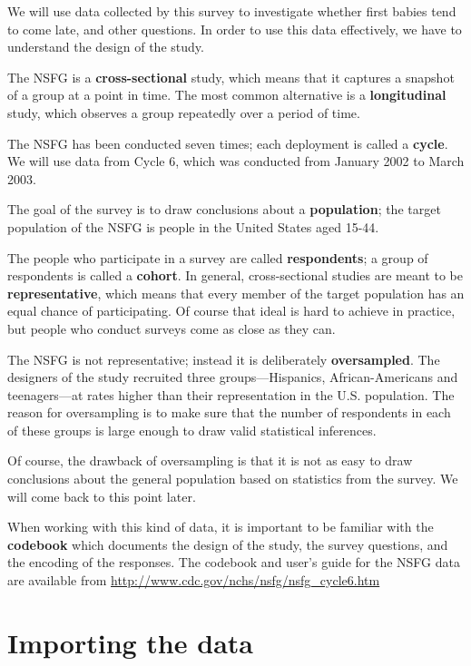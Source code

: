 \documentclass[12pt]{book}
\begin{document}
We will use data collected by this survey to investigate whether first
babies tend to come late, and other questions.  In order to use this
data effectively, we have to understand the design of the study.

The NSFG is a {\bf cross-sectional} study, which means that it
captures a snapshot of a group at a point in time.  The most
common alternative is a {\bf longitudinal} study, which observes a
group repeatedly over a period of time.

The NSFG has been conducted seven times; each deployment is called a
{\bf cycle}.  We will use data from Cycle 6, which was conducted from
January 2002 to March 2003.  

The goal of the survey is to draw conclusions about a {\bf
  population}; the target population of the NSFG is people in the
United States aged 15-44.  

The people who participate in a survey are called {\bf respondents}; a
group of respondents is called a {\bf cohort}.  In general,
cross-sectional studies are meant to be {\bf representative}, which
means that every member of the target population has an equal chance
of participating.  Of course that ideal is hard to achieve in
practice, but people who conduct surveys come as close as they can.
 

The NSFG is not representative; instead it is deliberately {\bf
  oversampled}.  The designers of the study recruited three
groups---Hispanics, African-Americans and teenagers---at rates higher
than their representation in the U.S. population.  The reason for
oversampling is to make sure that the number of respondents in each of
these groups is large enough to draw valid statistical inferences.

Of course, the drawback of oversampling is that it is not as easy
to draw conclusions about the general population based on statistics
from the survey.  We will come back to this point later.

When working with this kind of data, it is important to be familiar
with the {\bf codebook} which documents the design of the study, the
survey questions, and the encoding of the responses.  The codebook and
user's guide for the NSFG data are available from
\url{http://www.cdc.gov/nchs/nsfg/nsfg_cycle6.htm}


\section{Importing the data}
\end{document}
